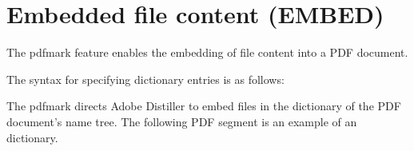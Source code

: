 \documentclass[letterpaper,12pt,english,openany,oneside]{sphinxmanual}
\begin{document}
\section{Embedded file content (EMBED)}
\label{\detokenize{pdfmark_Basic:embedded-file-content-embed}}
The pdfmark feature  enables the embedding of file content into a PDF document.

The syntax for specifying  dictionary entries is as follows:

\begin{sphinxVerbatim}[commandchars=\\\{\}]
\PYG{p}{[}   
                  
        
\end{sphinxVerbatim}

The  pdfmark directs Adobe Distiller to embed files in the  dictionary of the PDF document’s name tree. The following PDF segment is an example of an  dictionary.
\end{document}
